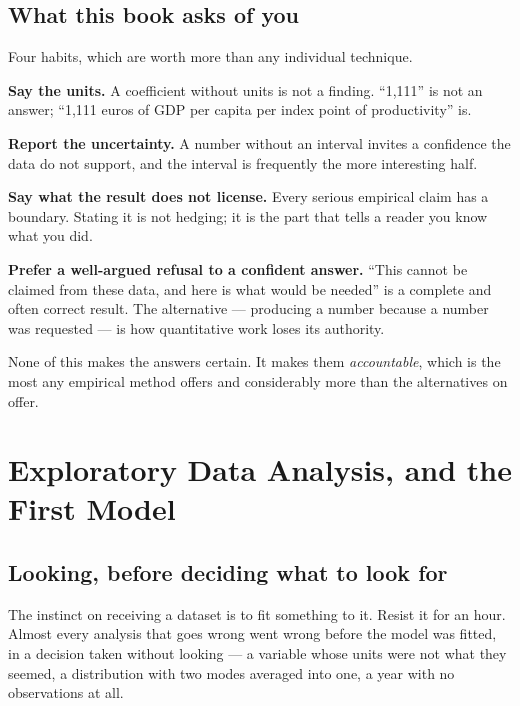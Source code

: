 \documentclass[
  letterpaper,
  10pt,
  twoside,
  openright,
  numbers=noenddot,
  chapterprefix=true]{scrbook}
\begin{document}
\section{What this book asks of you}\label{what-this-book-asks-of-you}

Four habits, which are worth more than any individual technique.

\textbf{Say the units.} A coefficient without units is not a finding.
``1,111'' is not an answer; ``1,111 euros of GDP per capita per index
point of productivity'' is.

\textbf{Report the uncertainty.} A number without an interval invites a
confidence the data do not support, and the interval is frequently the
more interesting half.

\textbf{Say what the result does not license.} Every serious empirical
claim has a boundary. Stating it is not hedging; it is the part that
tells a reader you know what you did.

\textbf{Prefer a well-argued refusal to a confident answer.} ``This
cannot be claimed from these data, and here is what would be needed'' is
a complete and often correct result. The alternative --- producing a
number because a number was requested --- is how quantitative work loses
its authority.

None of this makes the answers certain. It makes them
\emph{accountable}, which is the most any empirical method offers and
considerably more than the alternatives on offer.


\chapter{Exploratory Data Analysis, and the First
Model}\label{exploratory-data-analysis-and-the-first-model}

\section{Looking, before deciding what to look
for}\label{looking-before-deciding-what-to-look-for}

The instinct on receiving a dataset is to fit something to it. Resist it
for an hour. Almost every analysis that goes wrong went wrong before the
model was fitted, in a decision taken without looking --- a variable
whose units were not what they seemed, a distribution with two modes
averaged into one, a year with no observations at all.
\end{document}
